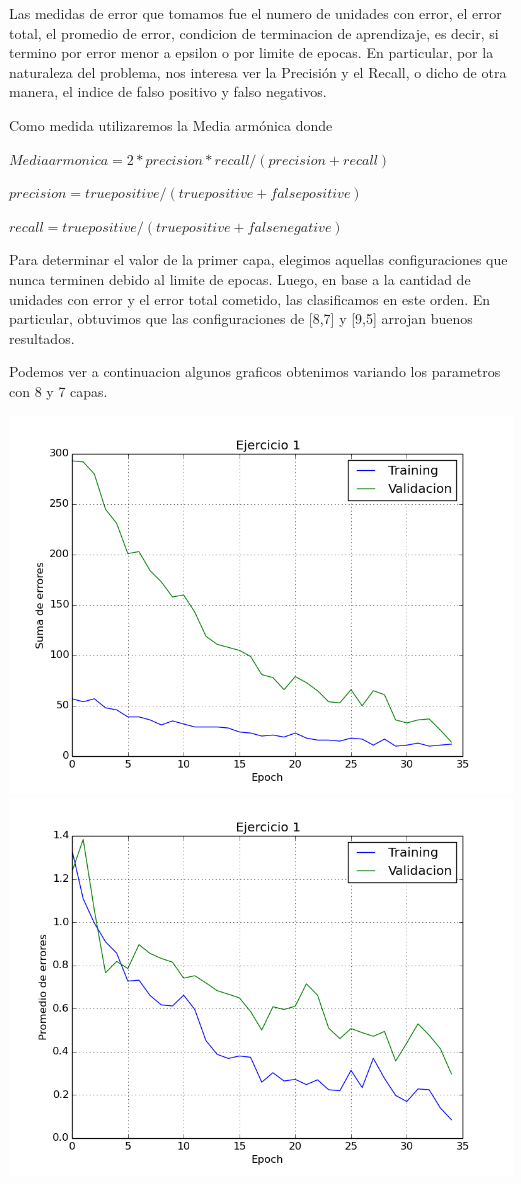 Las medidas de error que tomamos fue el numero de unidades con error, el error total, el promedio de error, condicion de terminacion de aprendizaje, es decir, si termino por error menor a epsilon o por limite de epocas. En particular, por la naturaleza del problema, nos interesa ver la Precisión y el Recall, o dicho de otra manera, el indice de falso positivo y falso negativos. 

Como medida utilizaremos la Media armónica donde 

$Media armonica=2*precision*recall/(precision+recall)$

$precision=true positive/(true positive+false positive)$

$recall= true positive/(true positive+false negative)$


Para determinar el valor de la primer capa, elegimos aquellas configuraciones que nunca terminen debido al limite de epocas. Luego, en base a la cantidad de unidades con error y el error total cometido, las clasificamos en este orden. 
En particular, obtuvimos que las configuraciones de [8,7] y [9,5] arrojan buenos resultados.

Podemos ver a continuacion algunos graficos obtenimos variando los parametros con 8 y 7 capas.

\includegraphics[scale=0.4]{img/ej100207187sum}
\includegraphics[scale=0.4]{img/ej100207187mean}

